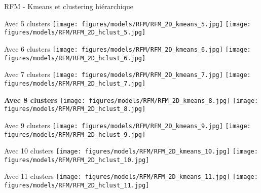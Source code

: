 \documentclass[10pt]{beamer}
\begin{document}
\begin{frame}{RFM - Kmeans et clustering hiérarchique}
    \begin{overprint}
        \begin{center}
            Avec 5 clusters
           \texttt{[image: figures/models/RFM/RFM\_2D\_kmeans\_5.jpg]}
           \texttt{[image: figures/models/RFM/RFM\_2D\_hclust\_5.jpg]}
        \end{center}
        \begin{center}            
            Avec 6 clusters
           \texttt{[image: figures/models/RFM/RFM\_2D\_kmeans\_6.jpg]}
           \texttt{[image: figures/models/RFM/RFM\_2D\_hclust\_6.jpg]}
        \end{center}
        \begin{center}             
             Avec 7 clusters
           \texttt{[image: figures/models/RFM/RFM\_2D\_kmeans\_7.jpg]}
           \texttt{[image: figures/models/RFM/RFM\_2D\_hclust\_7.jpg]}
        \end{center}
        \begin{center}             
            \textbf{Avec 8 clusters}
           \texttt{[image: figures/models/RFM/RFM\_2D\_kmeans\_8.jpg]}
           \texttt{[image: figures/models/RFM/RFM\_2D\_hclust\_8.jpg]}
        \end{center}
        \begin{center}             
            Avec 9 clusters
           \texttt{[image: figures/models/RFM/RFM\_2D\_kmeans\_9.jpg]}
           \texttt{[image: figures/models/RFM/RFM\_2D\_hclust\_9.jpg]}
        \end{center}
        \begin{center}             
            Avec 10 clusters
           \texttt{[image: figures/models/RFM/RFM\_2D\_kmeans\_10.jpg]}
           \texttt{[image: figures/models/RFM/RFM\_2D\_hclust\_10.jpg]}
        \end{center}
        \begin{center}             
            Avec 11 clusters
           \texttt{[image: figures/models/RFM/RFM\_2D\_kmeans\_11.jpg]}
           \texttt{[image: figures/models/RFM/RFM\_2D\_hclust\_11.jpg]}
        \end{center}
    \end{overprint}
\end{frame}
\end{document}
